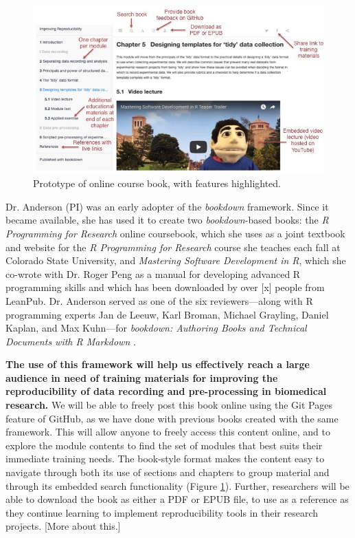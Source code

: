 \documentclass[pdftex,english,11pt,parskip=half]{scrartcl}
\begin{document}
\begin{figure}[t] \includegraphics[width =
\textwidth]{figures/book_prototype.jpg} \caption{Prototype of online course
book, with features highlighted.} \label{fig:prototype} \end{figure}

Dr. Anderson (PI) was an early adopter of the \textit{bookdown} framework. Since
it became available, she has used it to create two \textit{bookdown}-based
books: the \textit{R Programming for Research} online coursebook, which she uses
as a joint textbook and website for the \textit{R Programming for Research}
course she teaches each fall at Colorado State University, and \textit{Mastering
Software Development in R}, which she co-wrote with Dr. Roger Peng as a manual
for developing advanced R programming skills and which has been downloaded by
over [x] people from LeanPub. Dr. Anderson served as one of the six
reviewers---along with R programming experts Jan de Leeuw, Karl Broman, Michael
Grayling, Daniel Kaplan, and Max Kuhn---for \textit{bookdown: Authoring Books
and Technical Documents with R Markdown} \cite{xie2016bookdown}.

\textbf{The use of this framework will help us effectively reach a large
audience in need of training materials for improving the reproducibility of data
recording and pre-processing in biomedical research.} We will be able to freely
post this book online using the Git Pages feature of GitHub, as we have done
with previous books created with the same framework. This will allow anyone to
freely access this content online, and to explore the module contents to find
the set of modules that best suits their immediate training needs. The
book-style format makes the content easy to navigate through both its use of
sections and chapters to group material and through its embedded search
functionality (Figure \ref{fig:prototype}). Further, researchers will be able to
download the book as either a PDF or EPUB file, to use as a reference as they
continue learning to implement reproducibility tools in their research projects.
[More about this.]
\end{document}
